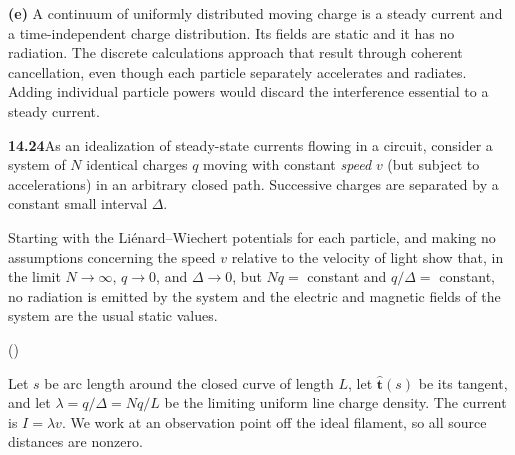 \textbf{(e)} A continuum of uniformly distributed moving charge is a
steady current and a time-independent charge distribution. Its fields
are static and it has no radiation. The discrete calculations approach
that result through coherent cancellation, even though each particle
separately accelerates and radiates. Adding individual particle powers
would discard the interference essential to a steady current.

\par\bigskip
\noindent\textbf{14.24}\quad As an idealization of steady-state currents flowing in a circuit, consider a system of $N$ identical charges $q$ moving with constant \emph{speed} $v$ (but subject to accelerations) in an arbitrary closed path. Successive charges are separated by a constant small interval $\Delta$.

Starting with the Li\'enard--Wiechert potentials for each particle, and making no assumptions concerning the speed $v$ relative to the velocity of light show that, in the limit $N\to\infty$, $q\to0$, and $\Delta\to0$, but $Nq=$ constant and $q/\Delta=$ constant, no radiation is emitted by the system and the electric and magnetic fields of the system are the usual static values.

()
\solution

Let $s$ be arc length around the closed curve of length $L$, let
$\hat{\mathbf t}(s)$ be its tangent, and let
$\lambda=q/\Delta=Nq/L$ be the limiting uniform line charge density.
The current is $I=\lambda v$. We work at an observation point off the
ideal filament, so all source distances are nonzero.


